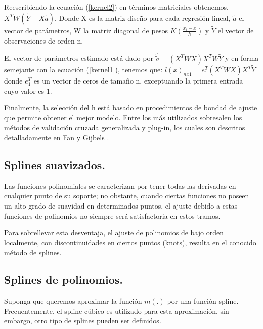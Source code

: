 \vspace*{0.2 cm}


\hspace*{0.4 cm} Reescribiendo la ecuaci\'on (\ref{kernel2}) en t\'erminos matriciales obtenemos, $X^{T}W(\tilde{Y}-X \tilde{a})$. Donde X es la matriz dise\~no para cada regresi\'on lineal, $\tilde{a}$ el vector de
par\'ametros, W la matriz diagonal de pesos $K(\frac{x_{i}-x}{h})$ y $\tilde{Y}$ el vector de observaciones de orden n.


\hspace*{0.4 cm} El vector de par\'ametros estimado est\'a dado por $ \hat{\tilde{a}} = (X^{T}WX)X^{T}W \tilde{Y} $
y en forma semejante con la ecuaci\'on (\ref{kernel1}), tenemos que: $l(x)_{nx1} = e_{1}^{T} (X^{T}WX)X^{T} \tilde{Y}$ donde $e_{1}^{T}$
es un vector de ceros de tama\~no n, exceptuando la primera entrada cuyo valor es 1.

\hspace*{0.4 cm}Finalmente, la selecci\'on del h est\'a basado en procedimientos de bondad de ajuste que permite obtener el mejor modelo. Entre los m\'as utilizados sobresalen los m\'etodos de validaci\'on cruzada generalizada y plug-in, los cuales son descritos detalladamente en Fan y Gijbels \cite{FG}.

\subsection{Splines suavizados.\\}

\hspace*{0.4 cm} Las funciones polinomiales se caracterizan por tener todas las derivadas en cualquier punto de su soporte; no obstante, cuando ciertas funciones no poseen un alto grado de suavidad en determinados puntos, el ajuste debido a estas funciones de polinomios no siempre ser\'a satisfactoria en estos tramos.

\hspace*{0.4 cm} Para sobrellevar esta desventaja, el ajuste de polinomios de bajo orden localmente, con discontinuidades en ciertos puntos (knots), resulta en el conocido m\'etodo de splines.

\subsection{Splines de polinomios.\\}


\hspace*{0.4 cm}Suponga que queremos aproximar la funci\'on $m(.)$ por una funci\'on spline. Frecuentemente, el spline c\'ubico es utilizado para esta aproximaci\'on, sin embargo, otro tipo de splines pueden ser definidos.


